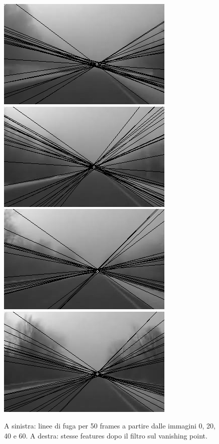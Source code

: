 \documentclass[12pt]{report}
\begin{document}
\begin{figure}
\begin{minipage}[c]{0.5\linewidth}
	\includegraphics[scale=\imTrackScale]{images/aF_0000_50.png}
	\includegraphics[scale=\imTrackScale]{images/aF_0020_50.png}
	\includegraphics[scale=\imTrackScale]{images/aF_0040_50.png}
	\includegraphics[scale=\imTrackScale]{images/aF_0060_50.png}
\end{minipage}
\caption[short]{A sinistra: linee di fuga per 50 frames a partire dalle immagini 0, 20, 40 e 60. A destra: stesse features dopo il filtro sul vanishing point.}
\label{fig:vp50}
\end{figure}
\end{document}
